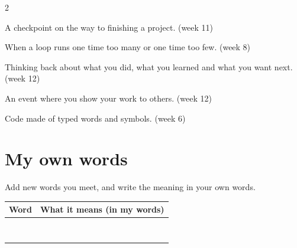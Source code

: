 \documentclass[level=1]{kidscode}
\begin{document}
\begin{multicols}{2}
\begin{description}[leftmargin=0pt,itemsep=3pt,font=\bfseries]
\item[Milestone] A checkpoint on the way to finishing a project. {\small\color{kcgrey}(week 11)}
\item[Off-by-one bug] When a loop runs one time too many or one time too few. {\small\color{kcgrey}(week 8)}
\item[Reflection] Thinking back about what you did, what you learned and what you want next. {\small\color{kcgrey}(week 12)}
\item[Showcase] An event where you show your work to others. {\small\color{kcgrey}(week 12)}
\item[text code] Code made of typed words and symbols. {\small\color{kcgrey}(week 6)}
\end{description}
\end{multicols}


\clearpage
\section{My own words}
Add new words you meet, and write the meaning in your own words.
\begin{center}\renewcommand{\arraystretch}{2.2}
\begin{tabularx}{\linewidth}{|p{4cm}|X|}
\hline
\textbf{Word} & \textbf{What it means (in my words)}\\ \hline
 & \\ \hline
 & \\ \hline
 & \\ \hline
 & \\ \hline
 & \\ \hline
 & \\ \hline
 & \\ \hline
 & \\ \hline
\end{tabularx}
\end{center}
\end{document}
